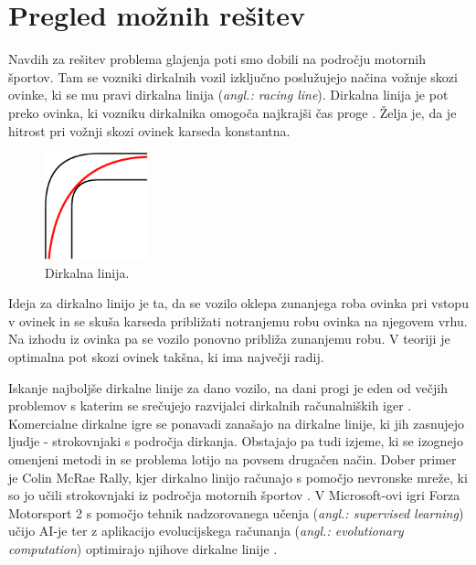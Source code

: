\documentclass[final,5p,times,twocolumn]{elsarticle}
\begin{document}
\section{Pregled možnih rešitev}

Navdih za rešitev problema glajenja poti smo dobili na področju motornih športov. Tam se vozniki dirkalnih vozil izključno poslužujejo načina vožnje skozi ovinke, ki se mu pravi dirkalna linija (\textit{angl.: racing line}). Dirkalna linija je pot preko ovinka, ki vozniku dirkalnika omogoča najkrajši čas proge \cite{Wiki}. Želja je, da je hitrost pri vožnji skozi ovinek karseda konstantna.
\begin{figure}[H]
	\centering
	\includegraphics[width=3cm]{slika4.png}
	\caption{Dirkalna linija.}
	\label{fig:slika}
\end{figure}
Ideja za dirkalno linijo je ta, da se vozilo oklepa zunanjega roba ovinka pri vstopu v ovinek in se skuša karseda približati notranjemu robu ovinka na njegovem vrhu. Na izhodu iz ovinka pa se vozilo ponovno približa zunanjemu robu. V teoriji je optimalna pot skozi ovinek takšna, ki ima največji radij.

Iskanje najboljše dirkalne linije za dano vozilo, na dani progi je eden od večjih problemov s katerim se srečujejo razvijalci dirkalnih računalniških iger \cite{cardamone2010searching}. Komercialne dirkalne igre se ponavadi zanašajo na dirkalne linije, ki jih zasnujejo ljudje - strokovnjaki s področja dirkanja. Obstajajo pa tudi izjeme, ki se izognejo omenjeni metodi in se problema lotijo na povsem drugačen način. Dober primer je Colin McRae Rally, kjer dirkalno linijo računajo s pomočjo nevronske mreže, ki so jo učili strokovnjaki iz področja motornih športov \cite{cardamone2010searching}. V Microsoft-ovi igri Forza Motorsport 2 s pomočjo tehnik nadzorovanega učenja (\textit{angl.: supervised learning}) učijo AI-je ter z aplikacijo evolucijskega računanja (\textit{angl.: evolutionary computation}) optimirajo njihove dirkalne linije \cite{pfeiffer2004machine}.
\end{document}
